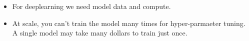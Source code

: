 \documentclass[11pt]{article}
\begin{document}
\begin{minipage}[l]{.5\linewidth}
    \begin{figure}[H]
        \centering
    \end{figure}    
\end{minipage}\hfill
\begin{minipage}[r]{.48\linewidth}
    \begin{itemize}
        \item For deeplearning we need model data and compute.
        \item At scale, you can't train the model many times for hyper-parmaeter tuning. A single model may take many dollars to train just once.
    \end{itemize}
\end{minipage}
\end{document}
